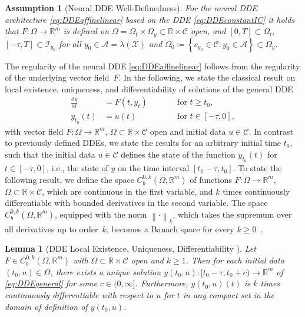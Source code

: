\documentclass[10pt]{article}
\numberwithin{equation}{section}
\newcommand*{\dd}{\mathrm{d}}
\newtheorem{lemma}[theorem]{Lemma}
\newtheorem{assumption}[theorem]{Assumption}
\newcommand\norm[1]{\left\lVert#1\right\rVert}
\begin{document}
	\begin{assumption}[Neural DDE Well-Definedness]\label{ass:vectorfield}
		For the neural DDE architecture \eqref{eq:DDEaffinelinear} based on the DDE \eqref{eq:DDEconstantIC} it holds that $F:\Omega\rightarrow\mathbb{R}^m$ is defined on $\Omega = \Omega_t \times \Omega_y \subset \mathbb{R}\times \mathcal{C}$ open, and $[0,T]\subset \Omega_t $, $[-\tau,T]\subset \mathcal{I}_{y_0}$ for all $y_0\in \mathcal{A} = \lambda(\mathcal{X})$ and $\Omega_0 \coloneqq \left\{c_{y_0}\in \mathcal{C}: y_0 \in \mathcal{A}\right\} \subset \Omega_y$.
	\end{assumption}
	
	The regularity of the neural DDE \eqref{eq:DDEaffinelinear} follows from the regularity of the underlying vector field~$F$. In the following, we state the classical result on local existence, uniqueness, and differentiability of solutions of the general DDE
	\begin{equation} \label{eq:DDEgeneral}
		\begin{aligned}
			\frac{\dd y}{\dd t} &= F(t,y_t) \qquad &&\text{for } t\geq t_0, \\  
			y_{t_0}(t) &= u(t) &&\text{for } t \in [-\tau,0],
		\end{aligned}
	\end{equation}
	with vector field $F:\Omega\rightarrow \mathbb{R}^m$, $\Omega \subset \mathbb{R}\times \mathcal{C}$ open and initial data $u \in \mathcal{C}$. In contrast to previously defined DDEs, we state the results for an arbitrary initial time $t_0$, such that the initial data $u \in \mathcal{C}$ defines the state of the function $y_{t_0}(t)$ for $t\in[-\tau,0]$, i.e., the state of $y$ on the time interval $[t_0-\tau,t_0]$. To state the following result, we define the space  $C^{0,k}_b(\Omega,\mathbb{R}^m)$ of functions \mbox{$F:\Omega\rightarrow \mathbb{R}^m$}, $\Omega \subset \mathbb{R}\times \mathcal{C}$, which are continuous in the first variable, and $k$ times continuously differentiable with bounded derivatives in the second variable. The space $C^{0,k}_b(\Omega,\mathbb{R}^m)$, equipped with the norm $\norm{\cdot}_k$, which takes the supremum over all derivatives up to order~$k$, becomes a Banach space for every $k \geq 0$~\cite{Hale1993}.
	
	
	
	\begin{lemma}[DDE Local Existence, Uniqueness, Differentiability \cite{Hale1993}] \label{lem:dde_regularity}
		Let $F\in C^{0,k}_b(\Omega,\mathbb{R}^m)$ with $\Omega \subset \mathbb{R}\times \mathcal{C}$ open and $k \geq 1$. Then for each initial data $(t_0,u)\in\Omega$, there exists a unique solution $y(t_0,u): [t_0-\tau,t_0+c)\rightarrow \mathbb{R}^m$ of \eqref{eq:DDEgeneral} for some $c\in(0,\infty]$. Furthermore, $y(t_0,u)(t)$ is $k$ times continuously differentiable with respect to $u$ for $t$ in any compact set in the domain of definition of $y(t_0,u)$.
	\end{lemma}
	
\end{document}
